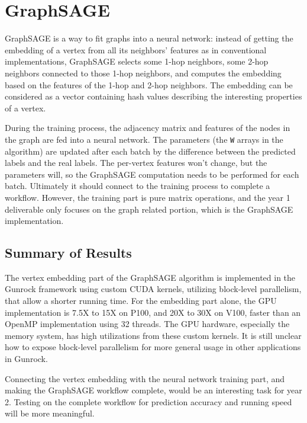 \documentclass[10pt,oneside]{memoir}
\begin{document}
\hypertarget{graphsage-1}{%
\chapter{GraphSAGE}\label{graphsage-1}}

GraphSAGE is a way to fit graphs into a neural network: instead of
getting the embedding of a vertex from all its neighbors' features as in
conventional implementations, GraphSAGE selects some 1-hop neighbors,
some 2-hop neighbors connected to those 1-hop neighbors, and computes
the embedding based on the features of the 1-hop and 2-hop neighbors.
The embedding can be considered as a vector containing hash values
describing the interesting properties of a vertex.

During the training process, the adjacency matrix and features of the
nodes in the graph are fed into a neural network. The parameters (the
\texttt{W} arrays in the algorithm) are updated after each batch by the
difference between the predicted labels and the real labels. The
per-vertex features won't change, but the parameters will, so the
GraphSAGE computation needs to be performed for each batch. Ultimately
it should connect to the training process to complete a workflow.
However, the training part is pure matrix operations, and the year 1
deliverable only focuses on the graph related portion, which is the
GraphSAGE implementation.

\hypertarget{summary-of-results-2}{%
\section{Summary of Results}\label{summary-of-results-2}}

The vertex embedding part of the GraphSAGE algorithm is implemented in
the Gunrock framework using custom CUDA kernels, utilizing block-level
parallelism, that allow a shorter running time. For the embedding part
alone, the GPU implementation is 7.5X to 15X on P100, and 20X to 30X on
V100, faster than an OpenMP implementation using 32 threads. The GPU
hardware, especially the memory system, has high utilizations from these
custom kernels. It is still unclear how to expose block-level
parallelism for more general usage in other applications in Gunrock.

Connecting the vertex embedding with the neural network training part,
and making the GraphSAGE workflow complete, would be an interesting task
for year 2. Testing on the complete workflow for prediction accuracy and
running speed will be more meaningful.
\end{document}

